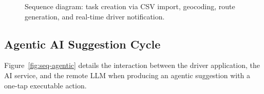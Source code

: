 \begin{figure}[ht]
{}%
  \caption{Sequence diagram: task creation via CSV import, geocoding,
           route generation, and real-time driver notification.}
  \label{fig:seq-task}
\end{figure}

\subsection{Agentic AI Suggestion Cycle}
\label{sec:seq-agentic}

Figure~\ref{fig:seq-agentic} details the interaction between the driver
application, the AI service, and the remote LLM when producing an agentic
suggestion with a one-tap executable action.

